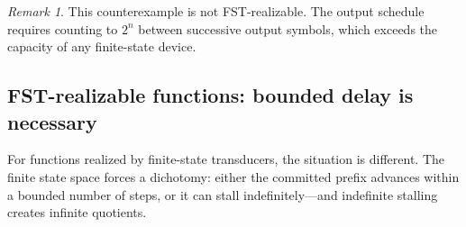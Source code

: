 \documentclass{article}
\theoremstyle{plain}
\theoremstyle{definition}
\theoremstyle{remark}
\newtheorem{remark}[theorem]{Remark}
\begin{document}
\begin{remark}
This counterexample is not FST-realizable.  The output schedule requires
counting to $2^n$ between successive output symbols, which exceeds the
capacity of any finite-state device.
\end{remark}

\subsection{FST-realizable functions: bounded delay is necessary}

For functions realized by finite-state transducers, the situation is different.
The finite state space forces a dichotomy: either the committed prefix advances
within a bounded number of steps, or it can stall indefinitely---and
indefinite stalling creates infinite quotients.
\end{document}

